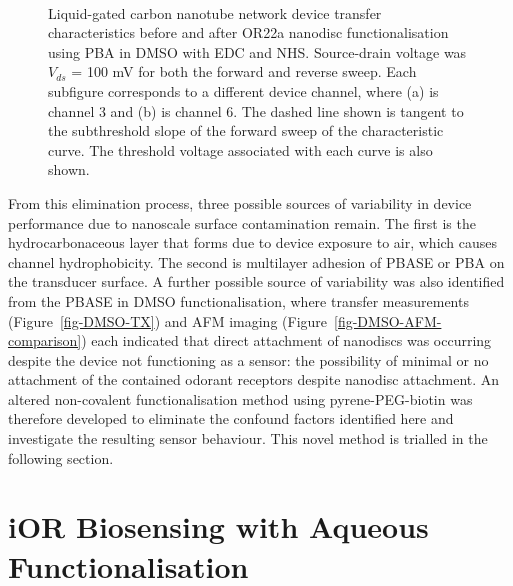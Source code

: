\documentclass[
  a4paper,
]{scrbook}
\begin{document}
\begin{figure}
\begin{minipage}[t]{0.45\linewidth}
{{}

}

\end{minipage}%
%
\begin{minipage}[t]{0.01\linewidth}

{\centering 

~

}

\end{minipage}%

\caption{\label{fig-EDCNHS-TX}Liquid-gated carbon nanotube network
device transfer characteristics before and after OR22a nanodisc
functionalisation using PBA in DMSO with EDC and NHS. Source-drain
voltage was \(V_{ds}\) = 100 mV for both the forward and reverse sweep.
Each subfigure corresponds to a different device channel, where (a) is
channel 3 and (b) is channel 6. The dashed line shown is tangent to the
subthreshold slope of the forward sweep of the characteristic curve. The
threshold voltage associated with each curve is also shown.}

\end{figure}

From this elimination process, three possible sources of variability in
device performance due to nanoscale surface contamination remain. The
first is the hydrocarbonaceous layer that forms due to device exposure
to air, which causes channel hydrophobicity. The second is multilayer
adhesion of PBASE or PBA on the transducer surface. A further possible
source of variability was also identified from the PBASE in DMSO
functionalisation, where transfer measurements
(Figure~\ref{fig-DMSO-TX}) and AFM imaging
(Figure~\ref{fig-DMSO-AFM-comparison}) each indicated that direct
attachment of nanodiscs was occurring despite the device not functioning
as a sensor: the possibility of minimal or no attachment of the
contained odorant receptors despite nanodisc attachment. An altered
non-covalent functionalisation method using pyrene-PEG-biotin was
therefore developed to eliminate the confound factors identified here
and investigate the resulting sensor behaviour. This novel method is
trialled in the following section.

\hypertarget{sec-aqueous-functionalisation-biosensing}{%
\section{iOR Biosensing with Aqueous
Functionalisation}\label{sec-aqueous-functionalisation-biosensing}}
\end{document}
